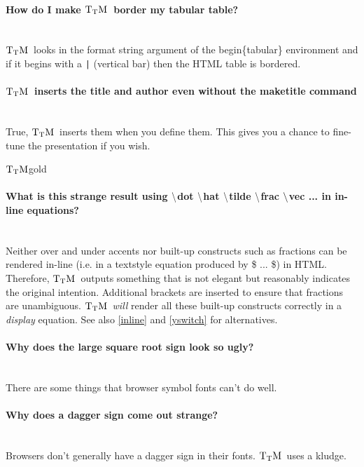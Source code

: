 \documentclass[12pt]{article}
\def\TtM{$\rm{}T_TH$}
\def\TtM{$\rm{}T_TM$}%
\def\TtMgold{\TtM{}gold}
\begin{document}
\paragraph{How do I make \TtM\ border my tabular table?}\leavevmode\\
\TtM\ looks in the format string argument of the begin\{tabular\}
environment and if it begins with a \verb!|! (vertical bar) then the HTML
table is bordered.

\paragraph{\TtM\ inserts the title and author even without the
maketitle command}\leavevmode\\
True, \TtM\ inserts them when you define them. This gives you a chance
to fine-tune the presentation if you wish.

\ifx\TtMgold\undefined
\paragraph{What is this strange result using $\tt\backslash$dot
$\tt\backslash$hat $\tt\backslash$tilde $\tt\backslash$frac
$\tt\backslash$vec ... in in-line equations?}\leavevmode\\
Neither over and under accents nor built-up constructs such as
fractions can be rendered in-line (i.e. in a textstyle equation
produced by \$ ... \$) in HTML. Therefore, \TtM\ outputs something that is
not elegant but reasonably indicates the original
intention. Additional brackets are inserted to ensure that fractions
are unambiguous. \TtM\ \emph{will} render all these built-up constructs
correctly in a \emph{display} equation. See also \ref{inline} and
\ref{yswitch} for alternatives.
\fi

\paragraph{Why does the large square root sign look so ugly?}\leavevmode\\
There are some things that browser symbol fonts can't do well.

\paragraph{Why does a dagger sign come out strange?}\leavevmode\\
Browsers don't generally have a dagger sign in their fonts. \TtM\ uses a
kludge.
\end{document}
